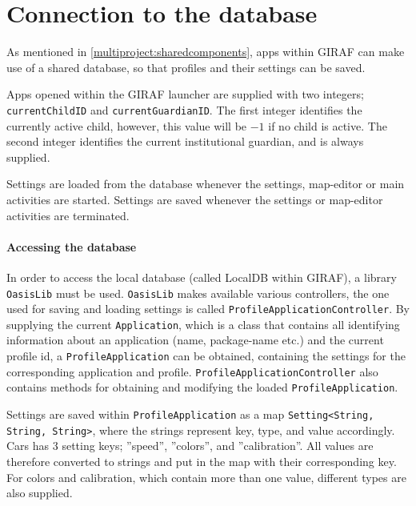 \section{Connection to the database}
\label{sprint3:database}

As mentioned in \cref{multiproject:sharedcomponents}, apps within GIRAF can make use of a shared database, so that profiles and their settings can be saved.

Apps opened within the GIRAF launcher are supplied with two integers; \lstinline|currentChildID| and \lstinline|currentGuardianID|.
The first integer identifies the currently active child, however, this value will be $-1$ if no child is active.
The second integer identifies the current institutional guardian, and is always supplied.

Settings are loaded from the database whenever the settings, map-editor or main activities are started.
Settings are saved whenever the settings or map-editor activities are terminated.

\paragraph{Accessing the database}

In order to access the local database (called LocalDB within GIRAF), a library \lstinline|OasisLib| must be used.
\lstinline|OasisLib| makes available various controllers, the one used for saving and loading settings is called \lstinline|ProfileApplicationController|.
By supplying the current \lstinline|Application|, which is a class that contains all identifying information about an application (name, package-name etc.) and the current profile id, a \lstinline|ProfileApplication| can be obtained, containing the settings for the corresponding application and profile.
\lstinline|ProfileApplicationController| also contains methods for obtaining and modifying the loaded \lstinline|ProfileApplication|.

Settings are saved within \lstinline|ProfileApplication| as a map \lstinline|Setting<String, String, String>|, where the strings represent key, type, and value accordingly.
Cars has 3 setting keys; ''speed'', ''colors'', and ''calibration''.
All values are therefore converted to strings and put in the map with their corresponding key. For colors and calibration, which contain more than one value, different types are also supplied.
